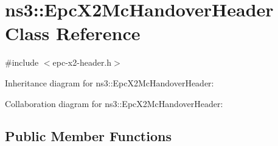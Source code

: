 \hypertarget{classns3_1_1EpcX2McHandoverHeader}{}\section{ns3\+:\+:Epc\+X2\+Mc\+Handover\+Header Class Reference}
\label{classns3_1_1EpcX2McHandoverHeader}


{\ttfamily \#include $<$epc-\/x2-\/header.\+h$>$}



Inheritance diagram for ns3\+:\+:Epc\+X2\+Mc\+Handover\+Header\+:


Collaboration diagram for ns3\+:\+:Epc\+X2\+Mc\+Handover\+Header\+:
\subsection*{Public Member Functions}
